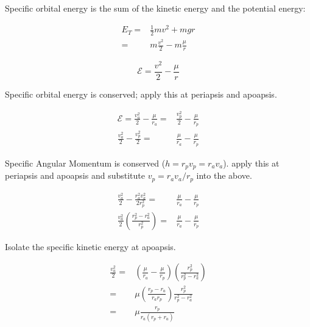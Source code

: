 \documentclass[10pt]{article}
\author{Farsyte}
\date{Year 001, Day 01}
\title{}
\begin{document}
\twocolumn
\setlength{\columnsep}{0.4cm}
\setlength{\columnseprule}{0.4pt}

Specific orbital energy
is the sum of the kinetic energy
and the potential energy:

\begin{equation*}
\begin{split}
E_T ={} & \frac{1}{2} m v^2 + m g r
\\ ={} & m \frac{v^2}{2} - m \frac{\mu}{r}
\end{split}
\end{equation*}

\begin{equation*}
\boxed{\mathcal{E} = \frac{v^2}{2} - \frac{\mu}{r}}
\end{equation*}

Specific orbital energy is conserved;
apply this at periapsis and apoapsis.

\begin{equation*}
\begin{split}
\mathcal{E}
= \frac{v_a^2}{2} - \frac{\mu}{r_a}
={} & \frac{v_p^2}{2} - \frac{\mu}{r_p}
\\
\frac{v_a^2}{2} - \frac{v_p^2}{2}
={} & \frac{\mu}{r_a} - \frac{\mu}{r_p}
\end{split}
\end{equation*}

Specific Angular Momentum is conserved
(\(h = r_p v_p = r_a v_a\)).
apply this at periapsis and apoapsis
and substitute \(v_p = r_a v_a / r_p\) into the above.

\begin{equation*}
\begin{split}
\frac{v_a^2}{2} - \frac{r_a^2 v_a^2}{2 r_p^2}
={} & \frac{\mu}{r_a} - \frac{\mu}{r_p}
\\
\frac{v_a^2}{2} \left(
\frac{r_p^2 - r_a^2}{r_p^2}
\right)
={} & \frac{\mu}{r_a} - \frac{\mu}{r_p}
\end{split}
\end{equation*}

Isolate the specific kinetic energy at apoapsis.

\begin{equation*}
\begin{split}
\frac{v_a^2}{2}
={} & 
\left(
\frac{\mu}{r_a} - \frac{\mu}{r_p}
\right)
\left(
\frac{r_p^2}{r_p^2 - r_a^2}
\right)
\\ ={} & \mu \left( \frac{r_p - r_a}{r_a r_p} \right)
\frac{r_p^2}{r_p^2 - r_a^2}
\\ ={} & \mu \frac{r_p}{r_a \left( r_p + r_a \right)}
\end{split}
\end{equation*}
\end{document}
